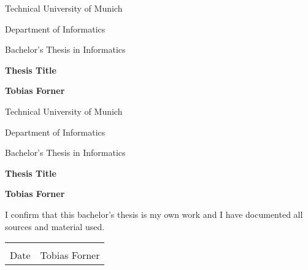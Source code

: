 \documentclass[xcolor=dvipsnames, tikz, 12pt]{article}
\newcommand{\nl}{\newline}
\theoremstyle{definition}
\begin{document}
	\begin{titlepage}
		\begin{center}
			\vspace*{1cm}
			
			\large
			Technical University of Munich\\
			\vspace*{1cm}
			
			Department of Informatics\\
			\vspace*{1cm}
			
			Bachelor's Thesis in Informatics\\
			\vspace*{1cm}
			
			\Huge
			\textbf{Thesis Title}
			
			\vspace{2cm}
			
			\Large
			\textbf{Tobias Forner}
			
			\vfill
			
		\end{center}
	\end{titlepage}

	\begin{titlepage}
		\begin{center}
			\vspace*{1cm}
			
			\large
			Technical University of Munich\\
			\vspace*{1cm}
			
			Department of Informatics\\
			\vspace*{1cm}
			
			Bachelor's Thesis in Informatics\\
			\vspace*{1cm}
			
			\Huge
			\textbf{Thesis Title}
			
			\vspace{2cm}
			
			\Large
			\textbf{Tobias Forner}
			
			\vfill
			
		\end{center}
	\end{titlepage}
	
	
	\thispagestyle{empty}
	\noindent I confirm that this bachelor's thesis is my own work and I have documented all sources and material used.\nl\nl
	\begin{center}
		\noindent\begin{tabular}{cc}
			\makebox[2.5in]{\hrulefill} & \makebox[2.5in]{\hrulefill}\\
			Date &	Tobias Forner
			
		\end{tabular}
		
	\end{center}
	
\end{document}
